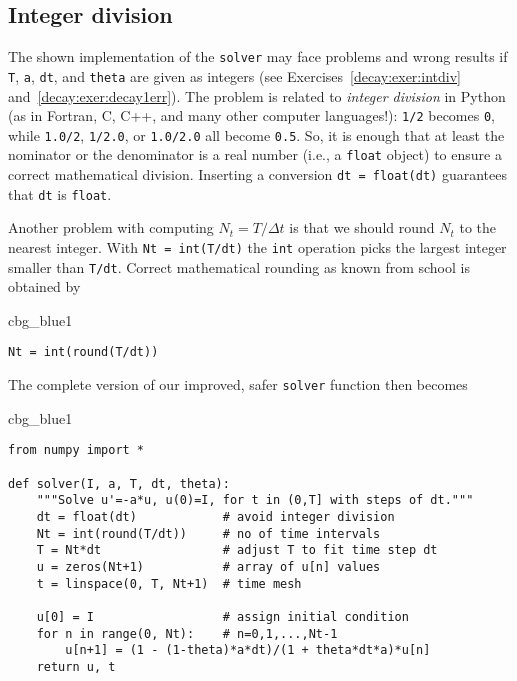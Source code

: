\documentclass[graybox,sectrefs,envcountresetchap,open=right,final]{svmonodo}
\newenvironment{_cod_tight}[1]{
   \def\FrameCommand{\colorbox{#1}}
   \FrameRule0.6pt\MakeFramed {\FrameRestore}\vskip3mm}
   {\vskip0mm\endMakeFramed}
\newenvironment{cod}[1]{
\bgroup\rmfamily
\fboxsep=0mm\relax
\begin{_cod_tight}{#1}
\list{}{\parsep=-2mm\parskip=0mm\topsep=0pt\leftmargin=2mm
\rightmargin=2\leftmargin\leftmargin=4pt\relax}
\item\relax}
{\endlist\end{_cod_tight}\egroup}
\begin{document}
\subsection{Integer division}

The shown implementation of the \texttt{solver} may face problems and
wrong results if \texttt{T}, \texttt{a}, \texttt{dt}, and \texttt{theta} are given as integers
(see Exercises~\ref{decay:exer:intdiv} and~\ref{decay:exer:decay1err}).
The problem is related to \emph{integer division} in Python (as
in Fortran, C, C++, and many other computer languages!): \texttt{1/2} becomes \texttt{0},
while \texttt{1.0/2}, \texttt{1/2.0}, or \texttt{1.0/2.0} all become \texttt{0.5}. So, it is enough
that at least the nominator or the denominator is a real number
(i.e., a \texttt{float} object)
to ensure a correct mathematical division. Inserting
a conversion \texttt{dt = float(dt)}
guarantees that \texttt{dt} is
\texttt{float}.

Another problem with computing $N_t=T/\Delta t$ is that we should
round $N_t$ to the nearest integer. With \texttt{Nt = int(T/dt)} the \texttt{int}
operation picks the largest integer smaller than \texttt{T/dt}. Correct
mathematical rounding as known from school is obtained by
\begin{cod}{cbg_blue1}\begin{Verbatim}[numbers=none,fontsize=\fontsize{9pt}{9pt},baselinestretch=0.95,xleftmargin=2mm]
Nt = int(round(T/dt))
\end{Verbatim}
\end{cod}
\noindent
The complete version of our improved, safer \texttt{solver} function then becomes

\begin{cod}{cbg_blue1}\begin{Verbatim}[numbers=none,fontsize=\fontsize{9pt}{9pt},baselinestretch=0.95,xleftmargin=2mm]
from numpy import *

def solver(I, a, T, dt, theta):
    """Solve u'=-a*u, u(0)=I, for t in (0,T] with steps of dt."""
    dt = float(dt)            # avoid integer division
    Nt = int(round(T/dt))     # no of time intervals
    T = Nt*dt                 # adjust T to fit time step dt
    u = zeros(Nt+1)           # array of u[n] values
    t = linspace(0, T, Nt+1)  # time mesh

    u[0] = I                  # assign initial condition
    for n in range(0, Nt):    # n=0,1,...,Nt-1
        u[n+1] = (1 - (1-theta)*a*dt)/(1 + theta*dt*a)*u[n]
    return u, t
\end{Verbatim}
\end{cod}
\noindent
\end{document}
